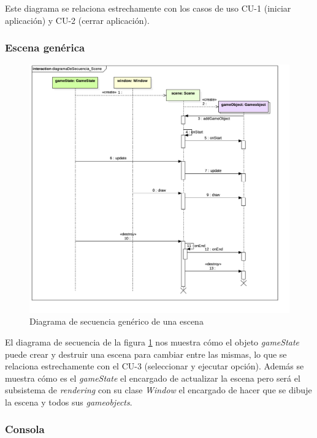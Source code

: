 \bigskip

Este diagrama se relaciona estrechamente con los casos de uso CU-1 (iniciar aplicación) y CU-2 (cerrar aplicación).

\subsubsection*{Escena genérica}

\begin{figure}
	\centerline{\includegraphics[width=15cm]{otros/UML/png/alld/png/CasosDeUso__General__Collaboration2__Interaction1__diagramaDeSecuencia_Scene_16.png}}
	\caption{Diagrama de secuencia genérico de una escena}
	\label{sec:scene}
\end{figure}

El diagrama de secuencia de la figura \ref{sec:scene} nos muestra cómo el objeto \textit{gameState} puede crear y destruir una escena para cambiar entre las mismas, lo que se relaciona estrechamente con el CU-3 (seleccionar y ejecutar opción). Además se muestra cómo es el \textit{gameState} el encargado de actualizar la escena pero será el subsistema de \textit{rendering} con su clase \textit{Window} el encargado de hacer que se dibuje la escena y todos sus \textit{gameobjects}.


\subsubsection*{Consola}


